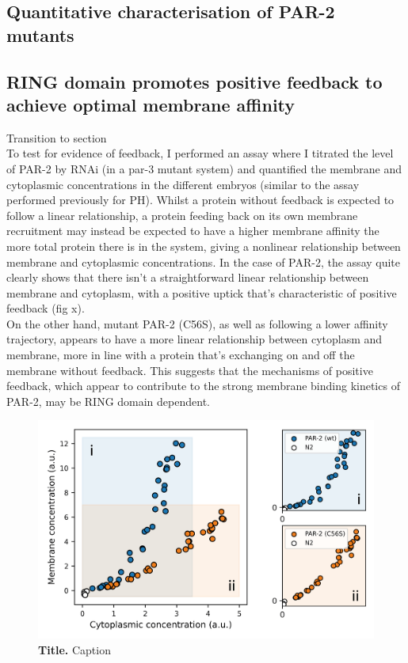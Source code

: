 \documentclass[12pt]{"article"}
\newcommand{\mycaption}[2]{\caption[#1]{\textbf{#1.} #2}}
\begin{document}
\clearpage
\subsection{Quantitative characterisation of PAR-2 mutants}

\clearpage
\subsection{RING domain promotes positive feedback to achieve optimal membrane affinity}

Transition to section\\

To test for evidence of feedback, I performed an assay where I titrated the level of PAR-2 by RNAi (in a par-3 mutant system) and quantified the membrane and cytoplasmic concentrations in the different embryos (similar to the assay performed previously for PH). Whilst a protein without feedback is expected to follow a linear relationship, a protein feeding back on its own membrane recruitment may instead be expected to have a higher membrane affinity the more total protein there is in the system, giving a nonlinear relationship between membrane and cytoplasmic concentrations. In the case of PAR-2, the assay quite clearly shows that there isn't a straightforward linear relationship between membrane and cytoplasm, with a positive uptick that's characteristic of positive feedback (fig x).\\

On the other hand, mutant PAR-2 (C56S), as well as following a lower affinity trajectory, appears to have a more linear relationship between cytoplasm and membrane, more in line with a protein that's exchanging on and off the membrane without feedback. This suggests that the mechanisms of positive feedback, which appear to contribute to the strong membrane binding kinetics of PAR-2, may be RING domain dependent.

\begin{figure}[!h]
\includegraphics[scale=1]{rundown_vs_c56s}
\setlength{\abovecaptionskip}{20pt}
\centering
\mycaption{Title}{Caption}
\label{fig:rundown_vs_c56s}
\end{figure}
\end{document}
